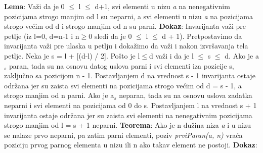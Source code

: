 \documentclass{article}
\begin{document}
\textbf{Lema}: Važi da je 0 $\leq$ l $\leq$ d+1, svi elementi u nizu \textit{a} na nenegativnim pozicijama strogo manjim od l su neparni, a svi elementi u nizu \textit{a} na pozicijama strogo većim od d i strogo manjim od n su parni.
\newline \hspace*{0.4cm}\textbf{Dokaz}:
\newline \hspace*{0.8cm}Invarijanta važi pre petlje (iz l=0, d=n-1 i n$\geq$0 sledi da je 0 $\leq$ l $\leq$ d + 1).
\newline \hspace*{0.8cm}Pretpostavimo da invarijanta važi pre ulaska u petlju i dokažimo da važi \hspace*{0.8cm}i nakon izvršavanja 	tela petlje. Neka je s = l + [(d-l) / 2]. Pošto je l$\leq$d \hspace*{0.8cm}važi i da je l $\leq$ s $\leq$ d. Ako je a$_s$ paran, tada 	su na osnovu datog uslova parni \hspace*{0.8cm}i svi elementi iza pozicije s, zaključno sa pozicijom n - 1. 	Postavljanjem \hspace*{0.8cm}d na vrednost s - 1 invarijanta ostaje održana jer su zaista svi elementi na \newline \hspace*{0.8cm}pozicijama strogo većim od d = s - 1, a strogo manjim od n parni. Ako \hspace*{0.8cm}je a$_s$ neparan, tada su 	na osnovu uslova zadatka neparni i svi elementi \hspace*{0.8cm}na pozicijama od 0 do s. Postavljanjem l na 	vrednost s + 1 invarijanta \hspace*{0.8cm}ostaje održana jer su zaista svi elementi na nenegativnim 	pozicijama strogo \hspace*{0.8cm}manjim od l = s + 1 neparni. 
\vspace{0.2cm}	\newline \textbf{Teorema}: Ako je n dužina niza \textit{a} i u nizu se nalaze prvo neparni, pa zatim parni elementi, poziv \textit{prviParan(a, n)} vraća poziciju prvog parnog elementa u nizu ili n ako takav element ne postoji.
\newline \hspace*{0.4cm}\textbf{Dokaz}:
\end{document}
